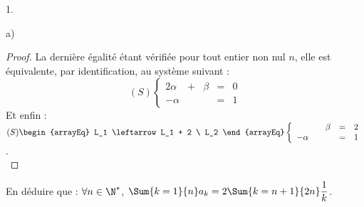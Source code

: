 \documentclass[11pt]{article}%
\begin{document}
\begin{noliste}{1.}
\begin{noliste}{a)}
\begin{proof}


      \noindent 
      La dernière égalité étant vérifiée pour tout entier non nul $n$,
      elle est équivalente, par identification, au système suivant :
      \[
      (S)
      \left\{
        \begin{array}{rcrcr}
          2 \alpha & + & \beta & = & 0 \\
          - \alpha & & & = & 1
        \end{array}
      \right.
      \]
      Et enfin : $(S)
      \begin{arrayEq}
        L_1 \leftarrow L_1 + 2 \ L_2
      \end{arrayEq}
      \left\{
        \begin{array}{rcrcr}
          & & \beta & = & 2 \\
          - \alpha & & & = & 1
        \end{array}
      \right.
      $. %
      ~\\[-1cm]
    \end{proof}

  \item En déduire que : $\forall n \in \N^*$, $\Sum{k = 1}{n} a_{k} =
    2 \Sum{k = n + 1}{2n} \dfrac{1}{k}$.


\end{noliste}
\end{noliste}
\end{document}
